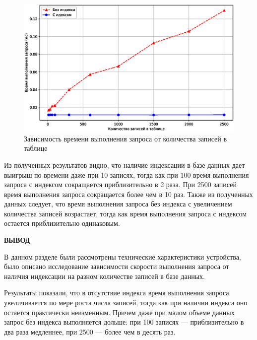 \begin{figure}[H]
	\centering
	\includegraphics[scale=0.7]{img/graph.eps}
	\caption{Зависимость времени выполнения запроса от количества записей в таблице}
	\label{fig:graph}
\end{figure}

Из полученных результатов видно, что наличие индексации в базе данных дает выигрыш по времени даже при 10 записях, тогда как при 100 время выполнения запроса с индексом сокращается приблизительно в 2 раза. При 2500 записей время выполнения запроса сокращается более чем в 10 раз. 
Также из полученных данных следует, что время выполнения запроса без индекса с увеличением количества записей возрастает, тогда как время выполнения запроса с индексом остается приблизительно одинаковым.

\clearpage
\textbf{ВЫВОД}

В данном разделе были рассмотрены технические характеристики устройства, было описано исследование зависимости скорости выполнения запроса от наличия индексации на разном количестве записей в базе данных. 

Результаты показали, что в отсутствие индекса время выполнения запроса увеличивается по мере роста числа записей, тогда как при наличии индекса оно остается практически неизменным. Причем даже при малом объеме данных запрос без индекса выполняется дольше: при 100 записях --- приблизительно в два раза медленнее, при 2500 --- более чем в десять раз.

\clearpage